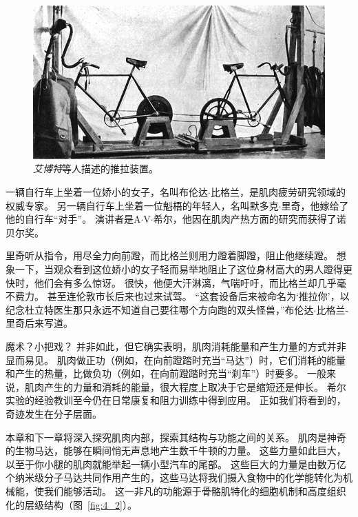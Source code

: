 \begin{figure}[!htb]
	\centering
	\includegraphics[width=1.0\linewidth]{chap4/4_1}
	\caption{\textit{艾博特}等人描述的推拉装置\cite{abbott1952physiological}。 \label{fig:4_1}}
\end{figure}


一辆自行车上坐着一位娇小的女子，名叫布伦达$\cdot$比格兰，是肌肉疲劳研究领域的权威专家。
另一辆自行车上坐着一位魁梧的年轻人，名叫默多克$\cdot$里奇，他嫁给了他的自行车“对手”。
演讲者是A$\cdot$V$\cdot$希尔，他因在肌肉产热方面的研究而获得了诺贝尔奖。


里奇听从指令，用尽全力向前蹬，而比格兰则用力蹬着脚蹬，阻止他继续蹬。
想象一下，当观众看到这位娇小的女子轻而易举地阻止了这位身材高大的男人蹬得更快时，他们会有多么惊讶。
很快，他便大汗淋漓，气喘吁吁，而比格兰却几乎毫不费力。
甚至连伦敦市长后来也过来试驾。
“这套设备后来被命名为‘推拉你’，以纪念杜立特医生那只永远不知道自己要往哪个方向跑的双头怪兽，”布伦达$\cdot$比格兰-里奇后来写道。


魔术？小把戏？
并非如此，但它确实表明，肌肉消耗能量和产生力量的方式并非显而易见。
肌肉做正功（例如，在向前蹬踏时充当“马达”）时，它们消耗的能量和产生的热量，比做负功（例如，在向前蹬踏时充当“刹车”）时要多。
一般来说，肌肉产生的力量和消耗的能量，很大程度上取决于它是缩短还是伸长。
希尔实验的经验教训至今仍在日常康复和阻力训练中得到应用。
正如我们将看到的，奇迹发生在分子层面。


本章和下一章将深入探究肌肉内部，探索其结构与功能之间的关系。
肌肉是神奇的生物马达，能够在瞬间悄无声息地产生数千牛顿的力量。
这些力量如此巨大，以至于你小腿的肌肉就能举起一辆小型汽车的尾部。
这些巨大的力量是由数万亿个纳米级分子马达共同作用产生的，这些马达将我们摄入食物中的化学能转化为机械能，使我们能够活动。
这一非凡的功能源于骨骼肌特化的细胞机制和高度组织化的层级结构（图~\ref{fig:4_2}）。


